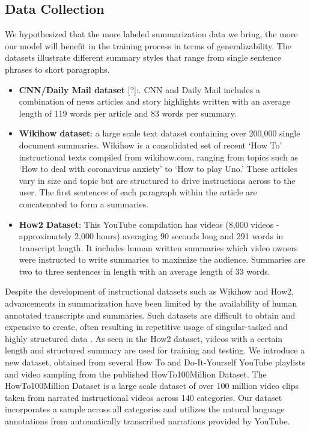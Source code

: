 \documentclass{article}
\begin{document}
\subsection{Data Collection}
We hypothesized that the more labeled summarization data we bring, the more our model will benefit in the training process in terms of generalizability. The datasets illustrate different summary styles that range from single sentence phrases to short paragraphs. 

\begin{itemize}

\item \textbf{CNN/Daily Mail dataset}  [?]:. CNN and Daily Mail includes a combination of news articles and story highlights written with an average length of 119 words per article and 83 words per summary.
\item \textbf{Wikihow dataset}: a large scale text dataset containing over 200,000 single document summaries. Wikihow is a consolidated set of recent ‘How To’ instructional texts compiled from wikihow.com, ranging from topics such as ‘How to deal with coronavirus anxiety’ to ‘How to play Uno.’ These articles vary in size and topic but are structured to drive instructions across to the user. The first sentences of each paragraph within the article are concatenated to form a summaries. 
\item \textbf{How2 Dataset}:  This YouTube compilation has videos (8,000 videos - approximately 2,000 hours) averaging 90 seconds long and 291 words in transcript length. It includes human written summaries which video owners were instructed to write summaries to maximize the audience. Summaries are two to three sentences in length with an average length of 33 words. 

\end{itemize}

Despite the development of instructional datasets such as Wikihow and How2, advancements in summarization have been limited by the availability of human annotated transcripts and summaries. Such datasets are difficult to obtain and expensive to create, often resulting in repetitive usage of singular-tasked and highly structured data . As seen in the How2 dataset, videos with a certain length and structured summary are used for training and testing. We introduce a new dataset, obtained from several How To and Do-It-Yourself YouTube playlists and video sampling from the published HowTo100Million Dataset. The HowTo100Million Dataset is a large scale dataset of over 100 million video clips taken from narrated instructional videos across 140 categories. Our dataset incorporates a sample across all categories and utilizes the natural language annotations from automatically transcribed narrations provided by YouTube.
\end{document}
